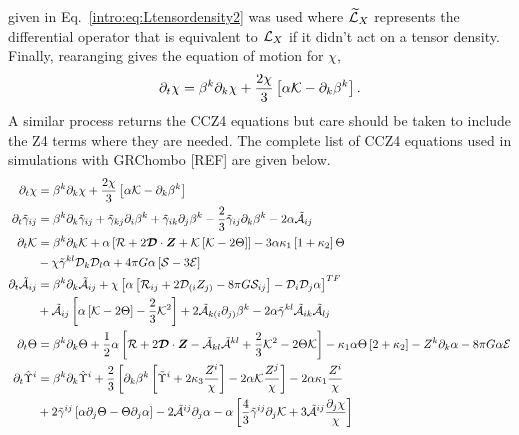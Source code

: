 given in Eq.~\ref{intro:eq:Ltensordensity2} was used where $ \widetilde{\mathcal{L}}_X$ represents the differential operator that is equivalent to $\mathcal{L}_X$ if it didn't act on a tensor density.
Finally, rearanging gives the equation of motion for $\chi$,
\begin{equation}
\partial_t \chi =  \beta^k \partial_k \chi + \frac{2\chi}{3} \left[\alpha \mathcal{K} - \partial_k \beta^k \right].
\end{equation}
A similar process returns the CCZ4 equations but care should be taken to include the Z4 terms where they are needed. The complete list of CCZ4 equations used in simulations with GRChombo [REF] are given below.
\begin{align} \partial_t \chi &=  \beta^k \partial_k \chi + \frac{2\chi}{3} \left[\alpha \K - \partial_k \beta^k \right]\\
\partial_t\tilde{\gamma}_{ij} &=  \beta^k\partial_k\tilde{\gamma}_{ij}  + \tilde{\gamma}_{kj}\partial_i \beta^k + \tilde{\gamma}_{ik}\partial_j\beta^k - \frac{2}{3}\tilde{\gamma}_{ij} \partial_k \beta^k - 2\alpha\tilde{\A}_{ij}\\
\partial_t\K &=  \beta^k\partial_k\K + \alpha\left[ \R + 2\bs{\D}\cdot \bs{Z} + \K\left[ \K-2\Theta\right]\right] - 3\alpha \kappa_1\left[ 1+\kappa_2\right]\Theta \nonumber\\
&-\chi\tilde{\gamma}^{kl}\D_k\D_l\alpha + 4\pi G\alpha\left[ \S - 3\E\right] \\
\partial_t\tilde{\A}_{ij} &=  \beta^k \partial_k \tilde{\A}_{ij}+\chi\left[\alpha\left[\R_{ij} + 2\D_{(i}Z_{j)}-8\pi G \S_{ij} \right] -\D_i\D_j\alpha \right]^{TF}\nonumber\\
& +\tilde{\A}_{ij}\left[ \alpha\left[ \K-2\Theta\right]-\frac{2}{3}\K^2\right] + 2\tilde{\A}_{k(i}\partial_{j)}\beta^k -2\alpha\tilde{\gamma}^{kl}\tilde{\A}_{ik}\tilde{\A}_{lj}\\
\partial_t\Theta &= \beta^k\partial_k \Theta + \frac{1}{2}\alpha\left[ \R + 2\bs{\D}\cdot \bs{Z} - \tilde{\A}_{kl} \tilde{\A}^{kl} + \frac{2}{3}\K^2 - 2\Theta\K\right] -\kappa_1\alpha\Theta\left[ 2+\kappa_2\right] - Z^k\partial_k\alpha - 8\pi G \alpha \E \\
\partial_t\hat{\Upsilon}^i &=  \beta^k \partial_k \hat{\Upsilon}^i + \frac{2}{3}\left[ \partial_k \beta^k \left[ \tilde{\Upsilon}^i+2\kappa_3 \frac{Z^{i}}{\chi}\right]-2\alpha\K\frac{Z^j}{\chi}\right]-2\alpha\kappa_1\frac{Z^i}{\chi}\nonumber \\
& + 2\tilde{\gamma}^{ij}\left[ \alpha\partial_j\Theta -\Theta \partial_j\alpha \right] -2\tilde{\A}^{ij}\partial_j\alpha - \alpha\left[ \frac{4}{3}\tilde{\gamma}^{ij}\partial_j\K + 3\tilde{\A}^{ij}\frac{\partial_j \chi}{\chi}\right]\nonumber\\

\end{align}
